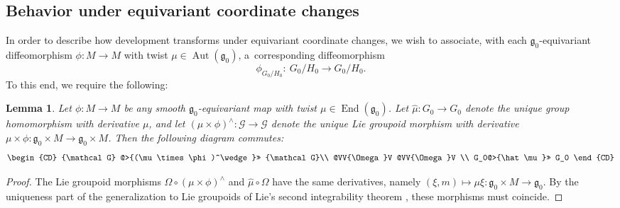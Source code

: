 \documentclass[11pt]{article}
\DeclareMathOperator{\automorphism}{Aut}
\DeclareMathOperator{\selfmorphism}{End}
\numberwithin{equation}{section}
\newtheorem{LemmaBlaom}[TheoremBlaom]{Lemma}
\begin{document}
\subsection{Behavior under equivariant coordinate changes}\label{yut}
In order to describe how development transforms under
equivariant coordinate changes, we wish to associate, with each
${\mathfrak g}_0$-equivariant dif\/feomorphism $\phi \colon M
\rightarrow M$ with twist $\mu \in \automorphism ({\mathfrak g}_0)$, a~corresponding dif\/feomorphism
\[
\phi_{G_0/H_0}\colon \ {G_0/H_0}
\rightarrow {G_0/H_0}.
\]
 To this end, we require the following:

\begin{LemmaBlaom}\label{LemmaA}
  Let $\phi \colon M \rightarrow M$ be any smooth ${\mathfrak
    g}_0$-equivariant map with twist $\mu \in \selfmorphism({\mathfrak
    g}_0)$. Let $\hat\mu \colon G_0 \rightarrow G_0$ denote the unique
  group homomorphism with derivative $\mu$, and let $(\mu \times
  \phi)^\wedge \colon {\mathcal G} \rightarrow {\mathcal G} $ denote
  the unique Lie groupoid morphism with derivative $\mu \times \phi \colon
  {\mathfrak g}_0 \times M \rightarrow {\mathfrak g}_0 \times M$. Then
  the following diagram commutes:
\begin{gather*}
  \begin{CD}
    {\mathcal G}   @>{(\mu \times \phi)^\wedge}>> {\mathcal G}\\
    @VV{\Omega}V @VV{\Omega}V \\
    G_0@>{\hat\mu}>> G_0
  \end{CD}
\end{gather*}
\end{LemmaBlaom}

\begin{proof}
  The Lie groupoid morphisms $\Omega \circ (\mu \times \phi)^\wedge$ and
  $\hat\mu \circ \Omega$ have the same derivatives, namely
  $(\xi,m)\mapsto \mu \xi \colon {\mathfrak g}_0 \times M \rightarrow
  {\mathfrak g}_0 $. By the uniqueness part of the generalization to
  Lie groupoids of Lie's second integrability theorem \cite[Lie~II]{Crainic_Fernandes_11}, these morphisms must coincide.
\end{proof}
\end{document}
